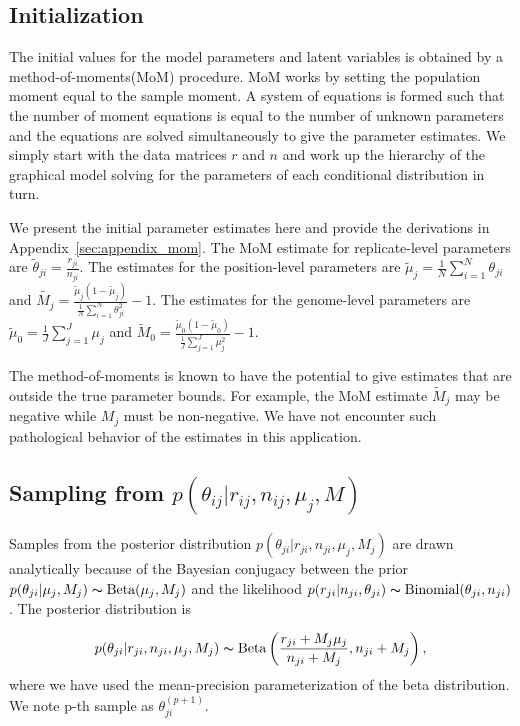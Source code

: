 \documentclass[11pt,reqno]{amsart}
\begin{document}
\subsection{Initialization}
The initial values for the model parameters and latent variables is obtained by a method-of-moments(MoM) procedure. MoM works by setting the population moment equal to the sample moment. A system of equations is formed such that the number of moment equations is equal to the number of unknown parameters and the equations are solved simultaneously to give the parameter estimates. We simply start with the data matrices $r$ and $n$ and work up the hierarchy of the graphical model solving for the parameters of each conditional distribution in turn.

We present the initial parameter estimates here and provide the derivations in Appendix~\ref{sec:appendix_mom}. The MoM estimate for replicate-level parameters are $\tilde{\theta}_{ji} = \frac{r_{ji}} {n_{ji}}$. The estimates for the position-level parameters are $\tilde{\mu}_j = \frac{1}{N} \sum_{i=1}^N \theta_{ji}$ and $\tilde{M_j} = \frac{ \tilde{\mu}_j (1 - \tilde{\mu}_j ) } { \frac{1}{N} \sum_{i=1}^N \theta_{ji}^2 } -1$. The estimates for the genome-level parameters are $\tilde{\mu}_0 = \frac{1}{J} \sum_{j=1}^J \mu_j$ and $\tilde{M}_0 = \frac{ \tilde{\mu}_0 (1 - \tilde{\mu}_0 ) } {\frac{1}{J} \sum_{j=1}^J \mu_j^2 } -1$.

The method-of-moments is known to have the potential to give estimates that are outside the true parameter bounds. For example, the MoM estimate $\tilde{M}_j$ may be negative while $M_j$ must be non-negative. We have not encounter such pathological behavior of the estimates in this application. 

\subsection{Sampling from $p \left( \theta_{ij} |r_{ij},n_{ij},\mu_j,M \right)$}

Samples from the posterior distribution $p(\theta_{ji} | r_{ji}, n_{ji}, \mu_j, M_j)$ are drawn analytically because of the Bayesian conjugacy between the prior $p(\theta_{ji} | \mu_j, M_j) \thicksim \text{Beta}(\mu_j, M_j)$ and the likelihood $p(r_{ji} | n_{ji}, \theta_{ji}) \thicksim \text{Binomial}(\theta_{ji}, n_{ji})$. The posterior distribution is 

\begin{equation}
	p(\theta_{ji} | r_{ji}, n_{ji}, \mu_j, M_j) \thicksim \text{Beta}\left( \frac{r_{ji} + M_j \mu_j}{n_{ji} + M_j} , n_{ji} + M_j\right),
\end{equation}
where we have used the mean-precision parameterization of the beta distribution. We note p-th sample as $\theta^{(p+1)}_{ji}$.
\end{document}

